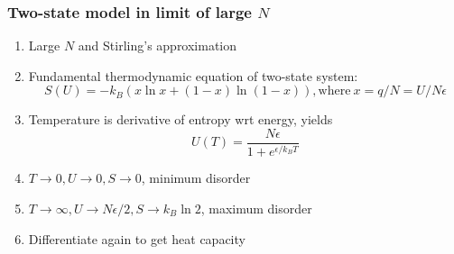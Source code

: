 \documentclass[11pt]{article}
\begin{document}
\subsubsection{Two-state model in limit of large \(N\)}
\label{sec:org067db55}
\begin{enumerate}
\item Large \(N\) and Stirling's approximation
\item Fundamental thermodynamic equation of two-state system:
\begin{displaymath}
  S(U)=-k_B \left ( x \ln x + (1-x) \ln (1-x) \right ), \mathrm{where}\
  x = q/N = U/N\epsilon
\end{displaymath}
\item Temperature is derivative of entropy wrt energy, yields
\begin{displaymath}
  U(T) = \frac{N\epsilon}{1+e^{\epsilon/k_BT}}
\end{displaymath}
\item \(T \rightarrow 0, U \rightarrow 0, S \rightarrow 0\), minimum disorder
\item \(T \rightarrow \infty, U \rightarrow N\epsilon/2, S \rightarrow k_B \ln 2\), maximum disorder
\item Differentiate again to get heat capacity
\end{enumerate}
\end{document}
